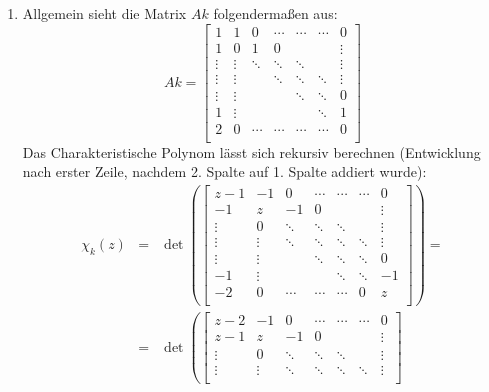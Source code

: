 \begin{enumerate}
\item Allgemein sieht die Matrix $Ak$ folgendermaßen aus:
	\[ Ak = \begin{bmatrix}
			1      & 1      & 0      & \cdots & \cdots & \cdots & 0      \\
			1      & 0      & 1      & 0      &        &        & \vdots \\
			\vdots & \vdots & \ddots & \ddots & \ddots &        & \vdots \\
			\vdots & \vdots &        & \ddots & \ddots & \ddots & \vdots \\
			\vdots & \vdots &        &        & \ddots & \ddots & 0      \\
			1      & \vdots &        &        &        & \ddots & 1      \\
			2      & 0      & \cdots & \cdots & \cdots & \cdots & 0      \\
		\end{bmatrix} \]
	Das Charakteristische Polynom lässt sich rekursiv berechnen (Entwicklung nach erster Zeile,
	nachdem 2. Spalte auf 1. Spalte addiert wurde):
	\begin{eqnarray*}
		\chi_k(z) &=& \det \left(
				\begin{bmatrix}
					z-1    & -1     & 0      & \cdots & \cdots & \cdots & 0      \\
					-1     & z      & -1     & 0      &        &        & \vdots \\
					\vdots & 0      & \ddots & \ddots & \ddots &        & \vdots \\
					\vdots & \vdots & \ddots & \ddots & \ddots & \ddots & \vdots \\
					\vdots & \vdots &        & \ddots & \ddots & \ddots & 0      \\
					-1     & \vdots &        &        & \ddots & \ddots & -1     \\
					-2     & 0      & \cdots & \cdots & \cdots & 0      & z      \\
				\end{bmatrix} \right) = \\
			&=& \det \left(
				\begin{bmatrix}
					z-2    & -1     & 0      & \cdots & \cdots & \cdots & 0      \\
					z-1    & z      & -1     & 0      &        &        & \vdots \\
					\vdots & 0      & \ddots & \ddots & \ddots &        & \vdots \\
					\vdots & \vdots & \ddots & \ddots & \ddots & \ddots & \vdots \\

\end{bmatrix}
\end{eqnarray*}
\end{enumerate}
